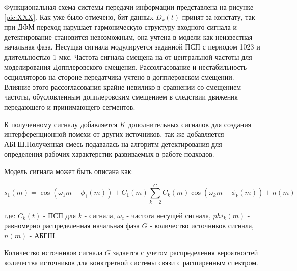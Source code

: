 Функциональная схема системы передачи информации представлена на рисунке \ref{pic:XXX}. Как уже было отмечено, бит данныx ${D_k(t)}$
принят за констату, так при ДФМ переход нарушает гармоническую структуру входного сигнала и детектирование становится невозможным,
она учтена в модели как неизвестная начальная фаза. Несущая сигнала модулируется заданной ПСП с периодом 1023 и длительностью 1 мкс.
Частота сигнала смещена на от центральной частоты для моделирования Допплеровского смещения. Рассолгасование и нестабильность
осцилляторов на стороне передатчика учтено в допплеровском смещении. Влияние этого рассогласования крайне невилико в сравнении
со смещением частоты, обусловленным допплеровским смещением в следствии движения передающего и принимающего сегментов.

К полученному сигналу добавляется ${K}$ дополнительных сигналов для создания интерференционной помехи от других источников,
так же добавляется АБГШ.Полученная смесь подавалась на алгоритм детектирования для определения рабочих характерстик развиваемых в работе подходов.

Модель сигнала может быть описана как:
\begin{center}
\begin{equation}
	\label{eq:sec4_model}
	s_1(m) = \cos(\omega_{1}m + \phi_1(m)) + C_1(m) \sum \limits_{k=2}^{G}C_k(m)\cos(\omega_{k}m + \phi_k(m)) + n(m)
\end{equation}
\end{center}
где: ${C_k(t)}$ - ПСП для ${k}$ - сигнала, ${\omega_{c}}$ - частота несущей сигнала, ${phi_k(m)}$ - равномерно распределенная начальная фаза
${G}$ - количество источников сигнала, ${n(m)}$ - АБГШ.

Количество источников сигнала ${G}$ задается с учетом распределения вероятностей количества источников для конктретной системы
связи с расширенным спектром.
